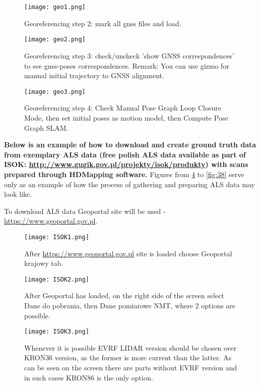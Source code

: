 \begin{figure}[H]
	\centering
	\texttt{[image: geo1.png]}
	\caption{Georeferencing step 2: mark all gnss files and load.}
	\label{fig:geo1}
\end{figure}

\begin{figure}[H]
	\centering
	\texttt{[image: geo2.png]}
	\caption{Georeferencing step 3: check/uncheck 'show GNSS correspondences' to see gnss-poses correspondences. Remark: You can use gizmo for manual initial trajectory to GNSS alignment.}
	\label{fig:geo2}
\end{figure}

\begin{figure}[H]
	\centering
	\texttt{[image: geo3.png]}
	\caption{Georeferencing step 4: Check Manual Pose Graph Loop Closure Mode, then set initial poses as motion model, then Compute Pose Graph SLAM.}
	\label{fig:geo3}
\end{figure}
\pagebreak

\textbf{Below is an example of how to download and create ground truth data from exemplary ALS data (free polish ALS data available as part of ISOK: \url{http://www.gugik.gov.pl/projekty/isok/produkty}) with scans prepared through HDMapping software.}
Figures from \ref{fig:34} to \ref{fig:38} serve only as an example of how the process of gathering and preparing ALS data may look like.

To download ALS data Geoportal site will be used - \url{https://www.geoportal.gov.pl}.

\begin{figure}[H]
	\centering
	\texttt{[image: ISOK1.png]}
	\caption{After \url{https://www.geoportal.gov.pl} site is loaded choose Geoportal krajowy tab.}
	\label{fig:34}
\end{figure}

\begin{figure}[H]
	\centering
	\texttt{[image: ISOK2.png]}
	\caption{After Geoportal has loaded, on the right side of the screen select Dane do pobrania, then Dane pomiarowe NMT, where 2 options are possible.}
	\label{fig:35}
\end{figure}

\begin{figure}[H]
	\centering
	\texttt{[image: ISOK3.png]}
	\caption{Whenever it is possible EVRF LIDAR version should be chosen over KRON36 version, as the former is more current than the latter. As can be seen on the screen there are parts without EVRF version and in such cases KRON86 is the only option.}
	\label{fig:36}
\end{figure}

